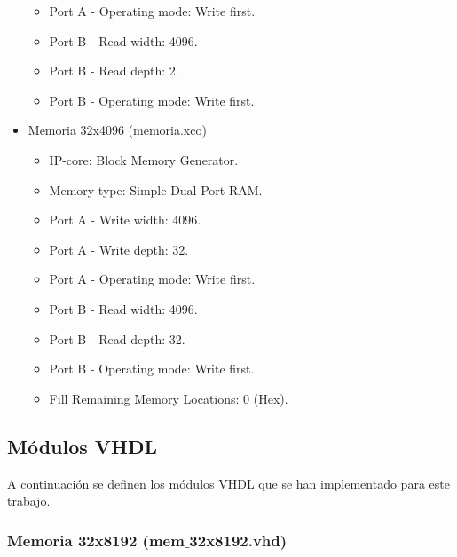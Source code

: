 \begin{itemize}
\begin{itemize}
            \item Port A - Operating mode: Write first.
            \item Port B - Read width: 4096.
            \item Port B - Read depth: 2.
            \item Port B - Operating mode: Write first.
        \end{itemize}
    \item Memoria 32x4096 (memoria.xco)
        \begin{itemize}
            \item IP-core: Block Memory Generator.
            \item Memory type: Simple Dual Port RAM.
            \item Port A - Write width: 4096.
            \item Port A - Write depth: 32.
            \item Port A - Operating mode: Write first.
            \item Port B - Read width: 4096.
            \item Port B - Read depth: 32.
            \item Port B - Operating mode: Write first.
            \item Fill Remaining Memory Locations: 0 (Hex).
        \end{itemize}
\end{itemize}

\subsection{Módulos VHDL}

A continuación se definen los módulos VHDL que se han implementado para este trabajo.

\subsubsection{Memoria 32x8192 (mem$\_$32x8192.vhd)}

